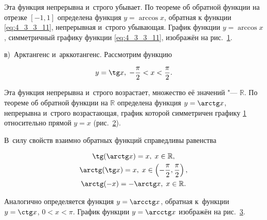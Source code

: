 \noindent
Эта функция непрерывна и~строго убывает. По теореме об обратной функции на отрезке
$[-1, 1]$ определена функция $y = \arccos x$, обратная к функции \eqref{eq:4_3_3_11},
непрерывная и~строго убывающая. График функции $y = \arccos x$, симметричный графику
функции \eqref{eq:4_3_3_11}, изображён на рис.\ \ref{fig:4_3_3_14}.

\begin{figure}\label{fig:4_3_3_14}
\end{figure}

в)~Арктангенс и~арккотангенс.\label{lst:4_3_3_3} Рассмотрим функцию

\begin{equation}\label{eq:4_3_3_14}
\displaystyle y = \tg x, \; -\frac{\pi}{2} < x < \frac{\pi}{2}.
\end{equation}

\noindent
Эта функция непрерывна и~строго возрастает, множество её значений "--- $\mathbb{R}$.
По теореме об обратной функции на $\mathbb{R}$ определена функция $y = \arctg x$,
непрерывна и~строго возрастающая, график которой симметричен графику \ref{fig:4_3_3_14}
относительно прямой $y = x$ (рис.\ \ref{fig:4_3_3_15}).

\begin{figure}\label{fig:4_3_3_15}
\end{figure}

В~силу свойств взаимно обратных функций справедливы равенства

\begin{gather*}
\tg (\arctg x) = x, \; x \in \mathbb{R}, \\
\displaystyle \arctg (\tg x) = x, \; x \in \left( -\frac{\pi}{2}, \frac{\pi}{2} \right), \\
\arctg (-x) = -\arctg x, \; x \in \mathbb{R}.
\end{gather*}

Аналогично определяется функция $y = \arcctg x$, обратная к~функции $y = \ctg x$,
$0 < x < \pi$. График функции $y = \arcctg x$ изображён на рис.\ \ref{fig:4_3_3_16}.

\begin{figure}\label{fig:4_3_3_16}
\end{figure}
